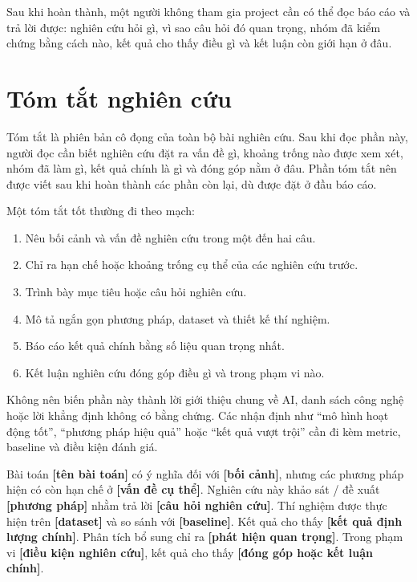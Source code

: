 \documentclass[12pt]{ai_conquer2026}
\begin{document}
Sau khi hoàn thành, một người không tham gia project cần có thể đọc báo cáo và trả lời được: nghiên cứu hỏi gì, vì sao câu hỏi đó quan trọng, nhóm đã kiểm chứng bằng cách nào, kết quả cho thấy điều gì và kết luận còn giới hạn ở đâu.

\newpage

\section{Tóm tắt nghiên cứu}

Tóm tắt là phiên bản cô đọng của toàn bộ bài nghiên cứu. Sau khi đọc phần này, người đọc cần biết nghiên cứu đặt ra vấn đề gì, khoảng trống nào được xem xét, nhóm đã làm gì, kết quả chính là gì và đóng góp nằm ở đâu. Phần tóm tắt nên được viết sau khi hoàn thành các phần còn lại, dù được đặt ở đầu báo cáo.

Một tóm tắt tốt thường đi theo mạch:

\begin{enumerate}
\item Nêu bối cảnh và vấn đề nghiên cứu trong một đến hai câu.
\item Chỉ ra hạn chế hoặc khoảng trống cụ thể của các nghiên cứu trước.
\item Trình bày mục tiêu hoặc câu hỏi nghiên cứu.
\item Mô tả ngắn gọn phương pháp, dataset và thiết kế thí nghiệm.
\item Báo cáo kết quả chính bằng số liệu quan trọng nhất.
\item Kết luận nghiên cứu đóng góp điều gì và trong phạm vi nào.
\end{enumerate}

Không nên biến phần này thành lời giới thiệu chung về AI, danh sách công nghệ hoặc lời khẳng định không có bằng chứng. Các nhận định như ``mô hình hoạt động tốt'', ``phương pháp hiệu quả'' hoặc ``kết quả vượt trội'' cần đi kèm metric, baseline và điều kiện đánh giá.

\begin{aivncodebox}
Bài toán \textbf{[tên bài toán]} có ý nghĩa đối với \textbf{[bối cảnh]}, nhưng các phương pháp hiện có còn hạn chế ở \textbf{[vấn đề cụ thể]}. Nghiên cứu này khảo sát / đề xuất \textbf{[phương pháp]} nhằm trả lời \textbf{[câu hỏi nghiên cứu]}. Thí nghiệm được thực hiện trên \textbf{[dataset]} và so sánh với \textbf{[baseline]}. Kết quả cho thấy \textbf{[kết quả định lượng chính]}. Phân tích bổ sung chỉ ra \textbf{[phát hiện quan trọng]}. Trong phạm vi \textbf{[điều kiện nghiên cứu]}, kết quả cho thấy \textbf{[đóng góp hoặc kết luận chính]}.
\end{aivncodebox}
\end{document}
